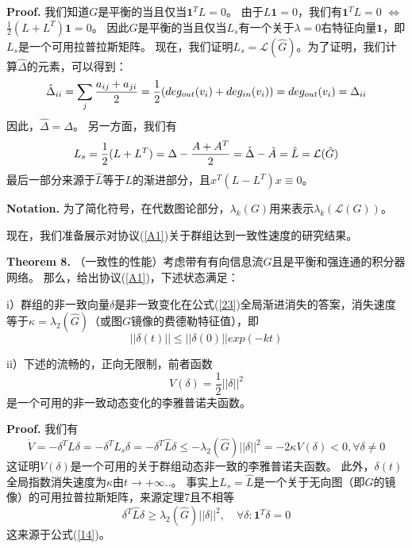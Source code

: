 \documentclass{article}
\begin{document}
\noindent\textbf{Proof.} 我们知道$G$是平衡的当且仅当$\textbf{1}^TL=0$。
由于$L\textbf{1}=0$，我们有$\mathbf{1}^TL=0$ $\Leftrightarrow$ $\frac{1}{2}(L+L^T)\mathbf{1}=0$。
因此$G$是平衡的当且仅当$L_s$有一个关于$\lambda=0$右特征向量$\mathbf{1}$，即$L_s$是一个可用拉普拉斯矩阵。
现在，我们证明$L_s=\mathcal{L}(\hat{G})$。为了证明，我们计算$\hat{\Delta}$的元素，可以得到：
\begin{equation}
    \hat{\Delta}_{ii}=\sum_j \frac{a_{ij}+a_{ji}}{2}=\frac{1}{2}(deg_{out}(v_i)+deg_{in}(v_i))=deg_{out}(v_i)=\Delta_{ii}
    \notag
\end{equation}
因此，$\hat{\Delta}=\Delta$。
另一方面，我们有
\begin{equation}
    L_s = \frac{1}{2}(L+L^T) = \Delta-\frac{A+A^T}{2}=\hat{\Delta}-\hat{A}=\hat{L}=\mathcal{L}(\hat{G})
    \notag
\end{equation}
最后一部分来源于$\hat{L}$等于$L$的渐进部分，且$x^T(L-L^T)x\equiv0$。

\noindent\textbf{Notation.} 为了简化符号，在代数图论部分，$\lambda_k(G)$用来表示$\lambda_k(\mathcal{L}(G))$。

现在，我们准备展示对协议(\ref{A1})关于群组达到一致性速度的研究结果。

\noindent\textbf{Theorem 8.} （一致性的性能）考虑带有有向信息流$G$且是平衡和强连通的积分器网络。
那么，给出协议(\ref{A1})，下述状态满足：

i）群组的非一致向量$\delta$是非一致变化在公式(\ref{23})全局渐进消失的答案，消失速度等于$\kappa=\lambda_2(\hat{G})$（或图$G$镜像的费德勒特征值），即
\begin{equation}
    \tag{27}
    \label{27}
    ||\delta(t)||\le ||\delta(0)||exp(-kt)
\end{equation}

ii）下述的流畅的，正向无限制，前者函数
\begin{equation}
    \tag{28}
    \label{28}
    V(\delta) = \frac{1}{2}||\delta||^2
\end{equation}
是一个可用的非一致动态变化的李雅普诺夫函数。

\noindent\textbf{Proof.} 我们有
\begin{equation}
    \tag{29}
    \label{29}
    \dot{V} = -\delta^TL\delta = -\delta^TL_s\delta = -\delta^T\hat{L}\delta \le -\lambda_2(\hat{G})||\delta||^2 = -2\kappa V(\delta) < 0, \forall \delta \ne 0
\end{equation}
这证明$V(\delta)$是一个可用的关于群组动态非一致的李雅普诺夫函数。
此外，$\delta(t)$全局指数消失速度为$\kappa$由$t\rightarrow +\infty ..$。
事实上$L_s = \hat{L}$是一个关于无向图（即$G$的镜像）的可用拉普拉斯矩阵，来源定理7且不相等
\begin{equation}
    \tag{30}
    \label{30}
    \delta^T \hat{L} \delta \ge \lambda_2(\hat{G})||\delta||^2,\quad \forall\delta:\mathbf{1}^T\delta=0
\end{equation}
这来源于公式(\ref{14})。
\end{document}
